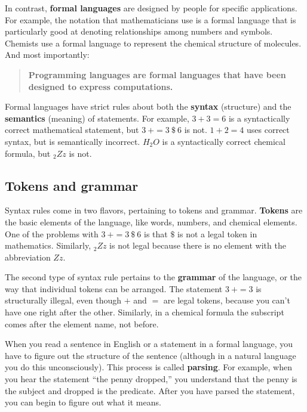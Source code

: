 
In contrast, {\bf formal languages} are designed by people for specific applications.
For example, the notation that mathematicians use is a formal language that is particularly good at denoting relationships among numbers and symbols.
Chemists use a formal language to represent the chemical structure of molecules.
And most importantly:


\begin{quote}
{\bf Programming languages are formal languages that have been designed to express computations.}
\end{quote}


Formal languages have strict rules about both the {\bf syntax} (structure) and the {\bf semantics} (meaning) of statements.
For example, $3 + 3 = 6$ is a syntactically correct mathematical statement, but $3\ + = 3\ \$\ 6$ is not.
$1 + 2 = 4$ uses correct syntax, but is semantically incorrect.
$H_2O$ is a syntactically correct chemical formula, but $_2Zz$ is not.

\subsection{Tokens and grammar}


Syntax rules come in two flavors, pertaining to tokens and grammar.
{\bf Tokens} are the basic elements of the language, like words, numbers, and chemical elements.
One of the problems with $3\ + = 3\ \$\ 6$ is that $\$$ is not a legal token in mathematics.
Similarly, $_2Zz$ is not legal because there is no element with the abbreviation $Zz$.


The second type of syntax rule pertains to the {\bf grammar} of the language, or the way that individual tokens can be arranged.
The statement $3\ + = 3$ is structurally illegal, even though $+$ and $=$ are legal tokens, because you can't have one right after the other.
Similarly, in a chemical formula the subscript comes after the element name, not before.


When you read a sentence in English or a statement in a formal language, you have to figure out the structure of the sentence (although in a natural language you do this unconsciously).
This process is called {\bf parsing}.
For example, when you hear the statement ``the penny dropped,'' you understand that the penny is the subject and dropped is the predicate.
After you have parsed the statement, you can begin to figure out what it means.

